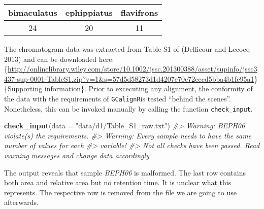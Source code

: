 \documentclass[]{article}
\newenvironment{Shaded}{}{}
\newcommand{\KeywordTok}[1]{\textbf{{#1}}}
\newcommand{\DataTypeTok}[1]{\textcolor[rgb]{0.50,0.00,0.00}{{#1}}}
\newcommand{\StringTok}[1]{\textcolor[rgb]{0.87,0.00,0.00}{{#1}}}
\newcommand{\CommentTok}[1]{\textcolor[rgb]{0.50,0.50,0.50}{\textit{{#1}}}}
\newcommand{\NormalTok}[1]{{#1}}
\begin{document}
\begin{longtable}[]{@{}ccc@{}}
\toprule
\begin{minipage}[b]{0.18\columnwidth}\centering\strut
bimaculatus\strut
\end{minipage} & \begin{minipage}[b]{0.18\columnwidth}\centering\strut
ephippiatus\strut
\end{minipage} & \begin{minipage}[b]{0.18\columnwidth}\centering\strut
flavifrons\strut
\end{minipage}\tabularnewline
\midrule
\endhead
\begin{minipage}[t]{0.18\columnwidth}\centering\strut
24\strut
\end{minipage} & \begin{minipage}[t]{0.18\columnwidth}\centering\strut
20\strut
\end{minipage} & \begin{minipage}[t]{0.18\columnwidth}\centering\strut
11\strut
\end{minipage}\tabularnewline
\bottomrule
\end{longtable}

The chromatogram data was extracted from Table S1 of (Dellicour and
Lecocq 2013) and can be downloaded here:
\{\url{http://onlinelibrary.wiley.com/store/10.1002/jssc.201300388/asset/supinfo/jssc3437-sup-0001-TableS1.zip?v=1\&s=57d5d58273d1d4207e70c72cecd5bba4b1fe95a1}\}\{Supporting
information\}. Prior to excecuting any alignment, the conformity of the
data with the requirements of \texttt{GCalignR}is tested ``behind the
scenes''. Nonetheless, this can be invoked manually by calling the
function \texttt{check\_input}.

\begin{Shaded}
\begin{Highlighting}[]
\KeywordTok{check_input}\NormalTok{(}\DataTypeTok{data =} \StringTok{"data/d1/Table_S1_raw.txt"}\NormalTok{)}
\CommentTok{#> Warning: BEPH06 violate(s) the requirements.}
\CommentTok{#> Warning: Every sample needs to have the same number of values for each}
\CommentTok{#> variable!}
\CommentTok{#> Not all checks have been passed. Read warning messages and change data accordingly}
\end{Highlighting}
\end{Shaded}

The output reveals that sample \emph{BEPH06} is malformed. The last row
contains both area and relative area but no retention time. It is
unclear what this represents. The respective row is removed from the
file we are going to use afterwards.
\end{document}
